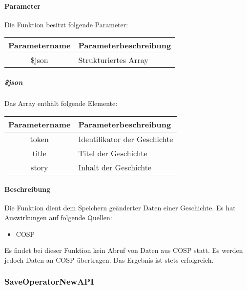 \paragraph{Parameter} Die Funktion besitzt folgende Parameter:
\begin{table}[H]
	\begin{tabular}{|c|p{11cm}|}
		\hline
		\textbf{Parametername} & \textbf{Parameterbeschreibung} \\ \hline
		\$json & Strukturiertes Array \\ \hline
	\end{tabular}
\end{table}
\subparagraph{\$json}Das Array enthält folgende Elemente:
\begin{table}[H]
	\begin{tabular}{|c|p{11cm}|}
		\hline
		\textbf{Parametername} & \textbf{Parameterbeschreibung} \\ \hline
		token & Identifikator der Geschichte \\ \hline
		title & Titel der Geschichte \\ \hline
		story & Inhalt der Geschichte \\ \hline
	\end{tabular}
\end{table}
\paragraph{Beschreibung} Die Funktion dient dem Speichern geänderter Daten einer Geschichte. Es hat Auswirkungen auf folgende Quellen:
\begin{itemize}
	\item COSP
\end{itemize}
Es findet bei dieser Funktion kein Abruf von Daten aus {\glqq COSP\grqq} statt. Es werden jedoch Daten an {\glqq COSP\grqq} übertragen. Das Ergebnis ist stets erfolgreich.
\subsubsection{SaveOperatorNewAPI}
